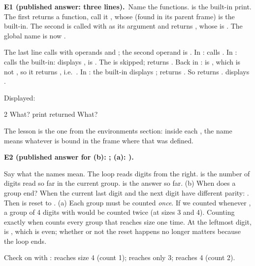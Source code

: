 \documentclass[10pt]{scrartcl}
\begin{document}
\begin{prob}\textbf{E1 (published answer: three lines).}\ Name the functions.  is the built-in print. The first  returns a function, call it , whose  (found in its parent frame) is the built-in. The second  is called with  as its argument and returns , whose  is . The global name  is now .
\begin{steps}
  \ii The last line calls  with operands  and ; the second operand is .
  \ii In :  calls .
  \ii In :  calls the built-in: displays ,  is . The  is skipped; returns .
  \ii Back in :  is , which is not , so it returns , i.e.\ .
  \ii In : the built-in displays ; returns . So  returns .
  \ii {} displays .
\end{steps}
Displayed:
\begin{plain}
2
What?
print returned What?
\end{plain}
The lesson is the one from the environments section: inside each , the name  means whatever is bound in the frame where that  was defined.
\end{prob}

\begin{prob}\textbf{E2 (published answer for (b): ; (a): ).}
\begin{steps}
  \ii Say what the names mean. The loop reads digits from the right.  is the number of digits read so far in the current group.  is the answer so far.
  \ii (b) When does a group end? When the current last digit and the next digit have different parity: . Then  is reset to .
  \ii (a) Each group must be counted \emph{once}. If we counted whenever , a group of 4 digits with  would be counted twice (at sizes 3 and 4). Counting exactly when  counts every group that reaches size  one time.
  \ii At the leftmost digit,  is , which is even; whether or not the reset happens no longer matters because the loop ends.
\end{steps}
Check on  with :  reaches size 4 (count 1);  reaches only 3;  reaches 4 (count 2).
\end{prob}
\end{document}
